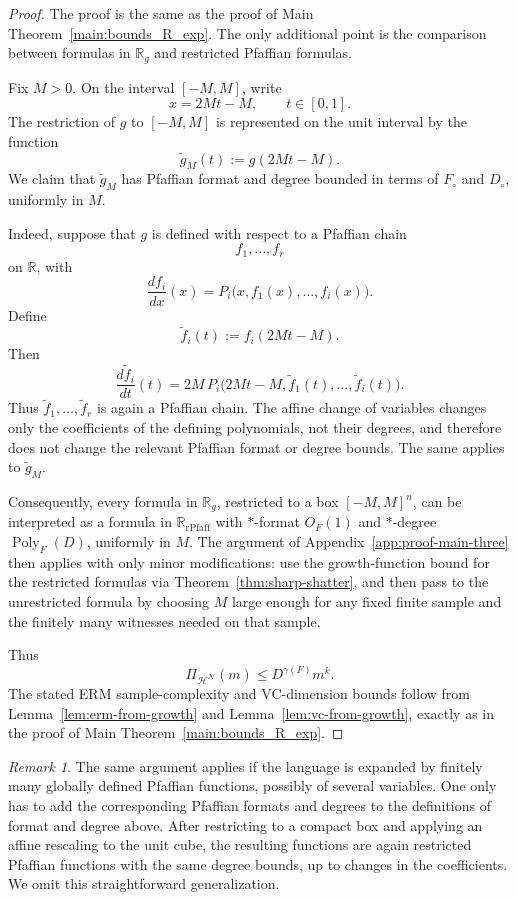 \documentclass[11pt]{article}
\theoremstyle{plain}
\theoremstyle{definition}
\theoremstyle{remark}
\newtheorem{remark}[theorem]{Remark}
\newcommand{\R}{\mathbb{R}}
\newcommand{\cN}{\mathcal{N}}
\newcommand{\Poly}{\operatorname{Poly}}
\newcommand{\rPfaff}{\operatorname{rPfaff}}
\begin{document}
\begin{proof}
The proof is the same as the proof of Main Theorem~\ref{main:bounds_R_exp}.
The only additional point is the comparison between formulas in \(\R_g\) and
restricted Pfaffian formulas.

Fix \(M>0\). On the interval \([-M,M]\), write
\[
  x=2Mt-M,\qquad t\in[0,1].
\]
The restriction of \(g\) to \([-M,M]\) is represented on the unit interval by
the function
\[
  \widetilde g_M(t):=g(2Mt-M).
\]
We claim that \(\widetilde g_M\) has Pfaffian format and degree bounded in
terms of \(F_\circ\) and \(D_\circ\), uniformly in \(M\).

Indeed, suppose that \(g\) is defined with respect to a Pfaffian chain
\[
  f_1,\ldots,f_r
\]
on \(\R\), with
\[
  \frac{d f_i}{dx}(x)
  =
  P_i\bigl(x,f_1(x),\ldots,f_i(x)\bigr).
\]
Define
\[
  \widetilde f_i(t):=f_i(2Mt-M).
\]
Then
\[
  \frac{d\widetilde f_i}{dt}(t)
  =
  2M\,
  P_i\bigl(2Mt-M,\widetilde f_1(t),\ldots,\widetilde f_i(t)\bigr).
\]
Thus \(\widetilde f_1,\ldots,\widetilde f_r\) is again a Pfaffian chain.
The affine change of variables changes only the coefficients of the defining
polynomials, not their degrees, and therefore does not change the relevant
Pfaffian format or degree bounds. The same applies to \(\widetilde g_M\).

Consequently, every formula in \(\R_g\), restricted to a box \([-M,M]^n\), can
be interpreted as a formula in \(\R_{\rPfaff}\) with \(*\)-format
\(O_F(1)\) and \(*\)-degree \(\Poly_F(D)\), uniformly in \(M\). The argument of Appendix~\ref{app:proof-main-three} then applies
with only minor modifications: use the
growth-function bound for the restricted formulas via Theorem~\ref{thm:sharp-shatter}, and then pass to the
unrestricted formula by choosing \(M\) large enough for any fixed finite sample
and the finitely many witnesses needed on that sample.

Thus
\[
  \Pi_{\mathcal H^\cN}(m)\le D^{\gamma(F)}m^k.
\]
The stated ERM sample-complexity and VC-dimension bounds follow from
Lemma~\ref{lem:erm-from-growth} and Lemma~\ref{lem:vc-from-growth}, exactly as
in the proof of Main Theorem~\ref{main:bounds_R_exp}.
\end{proof}

\begin{remark}
The same argument applies if the language is expanded by finitely many globally
defined Pfaffian functions, possibly of several variables. One only has to add
the corresponding Pfaffian formats and degrees to the definitions of format and
degree above. After restricting to a compact box and applying an affine
rescaling to the unit cube, the resulting functions are again restricted
Pfaffian functions with the same degree bounds, up to changes in the
coefficients. We omit this straightforward generalization.
\end{remark}
\end{document}
